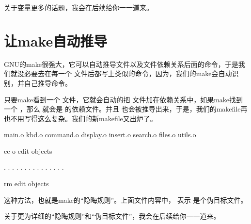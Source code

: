 \documentclass[a4paper,10pt]{sphinxmanual}
\begin{document}
关于变量更多的话题，我会在后续给你一一道来。


\section{让make自动推导}
\label{\detokenize{introduction:id4}}
GNU的make很强大，它可以自动推导文件以及文件依赖关系后面的命令，于是我们就没必要去在每一个
 文件后都写上类似的命令，因为，我们的make会自动识别，并自己推导命令。

只要make看到一个  文件，它就会自动的把  文件加在依赖关系中，如果make找到一个
 ，那么  就会是  的依赖文件。并且
 也会被推导出来，于是，我们的makefile再也不用写得这么复杂。我们的新makefile又出炉了。

\begin{sphinxVerbatim}[commandchars=\\\{\}]
  main.o kbd.o command.o display.o 
    insert.o search.o files.o utils.o

 
    cc \PYGZhy{}o edit objects

 .
 . .
 . .
 . .
 . .
 . .
 . . .
 .

 
    rm edit objects
\end{sphinxVerbatim}

这种方法，也就是make的“隐晦规则”。上面文件内容中，  表示  是个伪目标文件。

关于更为详细的“隐晦规则”和“伪目标文件”，我会在后续给你一一道来。
\end{document}
